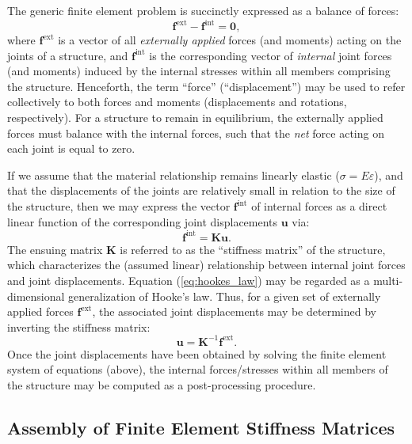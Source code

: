 \documentclass[12pt,a4paper,article]{memoir} %
\begin{document}
The generic finite element problem is succinctly expressed as a balance of forces:
\begin{equation}
	\mathbf{f}^{\text{ext}} - \mathbf{f}^{\text{int}} = \mathbf{0},
\end{equation}
where $\mathbf{f}^{\text{ext}}$ is a vector of all \textit{externally applied} forces (and moments) acting on the joints of a structure, and $\mathbf{f}^{\text{int}}$ is the corresponding vector of \textit{internal} joint forces (and moments) induced by the internal stresses within all members comprising the structure. Henceforth, the term ``force'' (``displacement'') may be used to refer collectively to both forces and moments (displacements and rotations, respectively). For a structure to remain in equilibrium, the externally applied forces must balance with the internal forces, such that the \textit{net} force acting on each joint is equal to zero.

If we assume that the material relationship remains linearly elastic ($\sigma = E \varepsilon$), and that the displacements of the joints are relatively small in relation to the size of the structure, then we may express the vector $\mathbf{f}^{\text{int}}$ of internal forces as a direct linear function of the corresponding joint displacements $\mathbf{u}$ via:
\begin{equation}
	\mathbf{f}^{\text{int}} = \mathbf{K} \mathbf{u}.
	\label{eq:hookes_law}
\end{equation}
The ensuing matrix $\mathbf{K}$ is referred to as the ``stiffness matrix'' of the structure, which characterizes the (assumed linear) relationship between internal joint forces and joint displacements. Equation (\ref{eq:hookes_law}) may be regarded as a multi-dimensional generalization of Hooke's law. Thus, for a given set of externally applied forces $\mathbf{f}^{\text{ext}}$, the associated joint displacements may be determined by inverting the stiffness matrix:
\begin{equation}
	\mathbf{u} = \mathbf{K}^{-1} \mathbf{f}^{\text{ext}}.
\end{equation}
Once the joint displacements have been obtained by solving the finite element system of equations (above), the internal forces/stresses within all members of the structure may be computed as a post-processing procedure.

\subsection{Assembly of Finite Element Stiffness Matrices}
\end{document}
